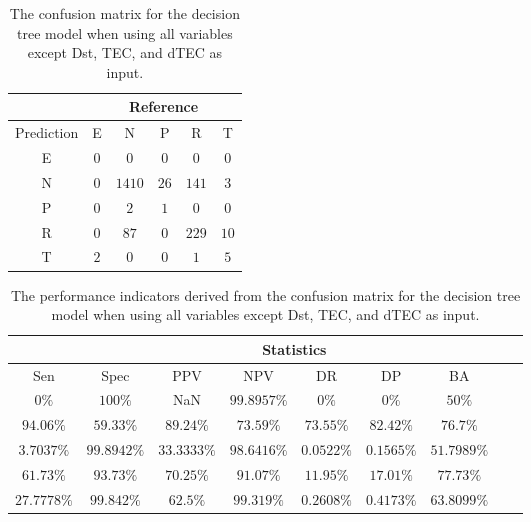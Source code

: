 \begin{table}[!ht]
	\centering
	\begin{tabular}{|c|c|c|c|c|c|}
		\hline
		 & \multicolumn{5}{|c|}{Reference} \\ \hline
		 Prediction & E & N & P & R & T \\ \hline
		 E & $0$ & $0$ & $0$ & $0$ & $0$ \\ \hline
		 N & $0$ & $1410$ & $26$ & $141$ & $3$ \\ \hline
		 P & $0$ & $2$ & $1$ & $0$ & $0$ \\ \hline
		 R & $0$ & $87$ & $0$ & $229$ & $10$ \\ \hline
		 T & $2$ & $0$ & $0$ & $1$ & $5$ \\ \hline
	\end{tabular}
	\caption{The confusion matrix for the decision tree model when using all variables except Dst, TEC, and dTEC as input.}
	\label{tab:cm:noTEC:C5.0}
\end{table}

\begin{table}[!ht]
	\centering
	\begin{tabular}{|c|c|c|c|c|c|c|c|c|}
		\hline
		 & \multicolumn{7}{c|}{Statistics} \\ \hline
		Sen & Spec & PPV & NPV & DR & DP & BA \\ \hline
		$0\%$ & $100\%$ & NaN & $99.8957\%$ & $0\%$ & $0\%$ & $50\%$ \\ \hline
		$94.06\%$ & $59.33\%$ & $89.24\%$ & $73.59\%$ & $73.55\%$ & $82.42\%$ & $76.7\%$ \\ \hline
		$3.7037\%$ & $99.8942\%$ & $33.3333\%$ & $98.6416\%$ & $0.0522\%$ & $0.1565\%$ & $51.7989\%$ \\ \hline
		$61.73\%$ & $93.73\%$ & $70.25\%$ & $91.07\%$ & $11.95\%$ & $17.01\%$ & $77.73\%$ \\ \hline
		$27.7778\%$ & $99.842\%$ & $62.5\%$ & $99.319\%$ & $0.2608\%$ & $0.4173\%$ & $63.8099\%$ \\ \hline
	\end{tabular}
	\caption{The performance indicators derived from the confusion matrix for the decision tree model when using all variables except Dst, TEC, and dTEC as input.}
	\label{tab:cs:noTEC:C5.0}
\end{table}
